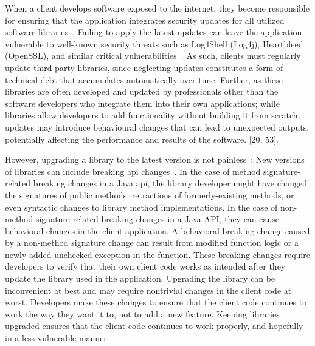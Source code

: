 When a client develops software exposed to the internet, they become responsible for ensuring that the application integrates security updates for all utilized software libraries~\cite{wu23:_under_threat_upstr_vulner_downs}. Failing to apply the latest updates can leave the application vulnerable to well-known security threats such as Log4Shell (Log4j), Heartbleed (OpenSSL), and similar critical vulnerabilities~\cite{haryono22:_autom_ident_librar_vulner_data,zhan21:_atvhun,alfadel23:_empir_python}. As such, clients must regularly update third-party libraries, since neglecting updates constitutes a form of technical debt that accumulates automatically over time. Further, as these libraries are often developed and updated by
professionals other than the software developers who integrate them into their own
applications; while libraries allow developers to add functionality without building it
from scratch, updates may introduce behavioural changes that can lead to unexpected
outputs, potentially affecting the performance and results of the software. [20, 53].


However, upgrading a library to the latest version is not painless~\cite{elizalde18:_towar_smoot_librar_migrat,derr17:_keep,dann23:_upcy}: New versions of libraries can include breaking \gls{api} changes~\cite{dietrich14:_broken}. In the case of method signature-related breaking changes in a Java \gls{api}, the library developer might have changed the signatures of public methods, retractions of
formerly-existing methods, or even syntactic changes to library method
implementations. In the case of non-method signature-related breaking changes in a Java API, they can cause behavioral changes in the client application. A behavioral breaking change caused by a non-method signature change can result from modified function logic or a newly added unchecked exception in the function. These breaking changes require developers to verify that their own client code works as intended after they update the library used in the application. Upgrading the library can be inconvenient at best and may require nontrivial changes in the client code at worst. Developers make these changes to ensure that the client code continues to work the way they want it to, not to add a new feature. Keeping libraries upgraded ensures that the client code continues to work properly, and hopefully in a less-vulnerable manner. 


